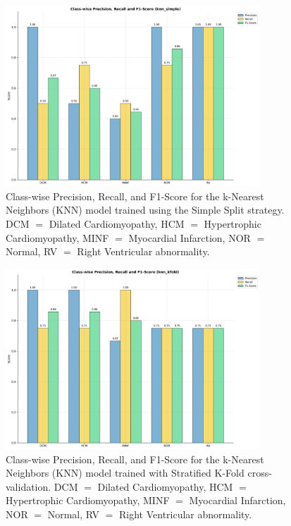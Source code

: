 \begin{figure}
	\begin{center}
		\includegraphics[width=0.85\textwidth]{../images/metrics/knn/knn_simple_class_wise_metrics.png}
	\end{center}
	\caption{Class-wise Precision, Recall, and F1-Score for the k-Nearest
		Neighbors (KNN) model trained using the Simple Split strategy. DCM $=$
		Dilated Cardiomyopathy, HCM $=$ Hypertrophic Cardiomyopathy, MINF $=$
		Myocardial Infarction, NOR $=$ Normal, RV $=$ Right Ventricular abnormality.}
\end{figure}

\begin{figure}
	\begin{center}
		\includegraphics[width=0.85\textwidth]{../images/metrics/knn/knn_kfold_class_wise_metrics.png}
	\end{center}
	\caption{Class-wise Precision, Recall, and F1-Score for the k-Nearest
		Neighbors (KNN) model trained with Stratified K-Fold cross-validation. DCM
		$=$ Dilated Cardiomyopathy, HCM $=$ Hypertrophic Cardiomyopathy, MINF $=$
		Myocardial Infarction, NOR $=$ Normal, RV $=$ Right Ventricular abnormality.}
\end{figure}

